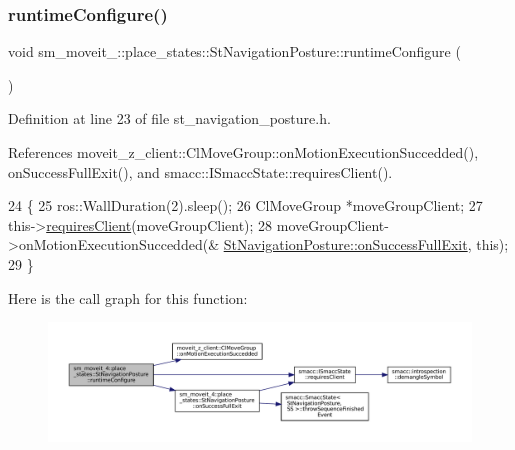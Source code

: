 \subsubsection{\texorpdfstring{runtime\+Configure()}{runtimeConfigure()}}
{\footnotesize\ttfamily void sm\+\_\+moveit\+\_\+::place\+\_\+states\+::\+St\+Navigation\+Posture\+::runtime\+Configure (\begin{DoxyParamCaption}{ }\end{DoxyParamCaption})\hspace{0.3cm}{\ttfamily [inline]}}



Definition at line 23 of file st\+\_\+navigation\+\_\+posture.\+h.



References moveit\+\_\+z\+\_\+client\+::\+Cl\+Move\+Group\+::on\+Motion\+Execution\+Succedded(), on\+Success\+Full\+Exit(), and smacc\+::\+I\+Smacc\+State\+::requires\+Client().


\begin{DoxyCode}
24             \{
25                 ros::WallDuration(2).sleep();
26                 ClMoveGroup *moveGroupClient;
27                 this->\hyperlink{classsmacc_1_1ISmaccState_a7f95c9f0a6ea2d6f18d1aec0519de4ac}{requiresClient}(moveGroupClient);
28                 moveGroupClient->onMotionExecutionSuccedded(&
      \hyperlink{structsm__moveit__4_1_1place__states_1_1StNavigationPosture_a95ab74dae51538aeae46f71b515bc61e}{StNavigationPosture::onSuccessFullExit}, \textcolor{keyword}{this});
29             \}
\end{DoxyCode}
Here is the call graph for this function\+:
\nopagebreak
\begin{figure}[H]
\begin{center}
\leavevmode
\includegraphics[width=350pt]{structsm__moveit__4_1_1place__states_1_1StNavigationPosture_aaf8ca02fa5a8185baf6bfc55731b1926_cgraph}
\end{center}
\end{figure}
\mbox{\label{structsm__moveit__4_1_1place__states_1_1StNavigationPosture_a29ac0c6cd858bb59ca3bc103da13b0a0}} 
